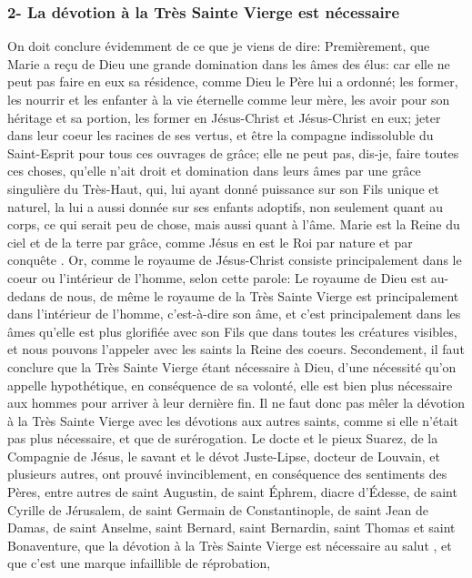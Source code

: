 \subsubsection{2- La dévotion à la Très Sainte Vierge est nécessaire}
 On doit conclure évidemment de ce que je viens de dire:
Premièrement, que Marie a reçu de Dieu une grande domination dans les âmes des élus: car elle ne peut pas faire
en eux sa résidence, comme Dieu le Père lui a ordonné; les former, les nourrir et les enfanter à la vie éternelle
comme leur mère, les avoir pour son héritage et sa portion, les former en Jésus-Christ et Jésus-Christ en eux; jeter
dans leur coeur les racines de ses vertus, et être la compagne indissoluble du Saint-Esprit pour tous ces ouvrages
de grâce; elle ne peut pas, dis-je, faire toutes ces choses, qu'elle n'ait droit et domination dans leurs âmes par une
grâce singulière du Très-Haut, qui, lui ayant donné puissance sur son Fils unique et naturel, la lui a aussi donnée
sur ses enfants adoptifs, non seulement quant au corps, ce qui serait peu de chose, mais aussi quant à l'âme.
 Marie est la Reine du ciel et de la terre par grâce, comme Jésus en est le Roi par nature et par conquête . Or,
comme le royaume de Jésus-Christ consiste principalement dans le coeur ou l'intérieur de l'homme, selon cette
parole: Le royaume de Dieu est au-dedans de nous, de même le royaume de la Très Sainte Vierge est
principalement dans l'intérieur de l'homme, c'est-à-dire son âme, et c'est principalement dans les âmes qu'elle est
plus glorifiée avec son Fils que dans toutes les créatures visibles, et nous pouvons l'appeler avec les saints la
Reine des coeurs.
 Secondement, il faut conclure que la Très Sainte Vierge étant nécessaire à Dieu, d'une nécessité qu'on
appelle hypothétique, en conséquence de sa volonté, elle est bien plus nécessaire aux hommes pour arriver à leur
dernière fin. Il ne faut donc pas mêler la dévotion à la Très Sainte Vierge avec les dévotions aux autres saints,
comme si elle n'était pas plus nécessaire, et que de surérogation.
 Le docte et le pieux Suarez, de la Compagnie de Jésus, le savant et le dévot Juste-Lipse, docteur de Louvain,
et plusieurs autres, ont prouvé invinciblement, en conséquence des sentiments des Pères, entre autres de saint
Augustin, de saint Éphrem, diacre d'Édesse, de saint Cyrille de Jérusalem, de saint Germain de Constantinople,
de saint Jean de Damas, de saint Anselme, saint Bernard, saint Bernardin, saint Thomas et saint Bonaventure,
que la dévotion à la Très Sainte Vierge est nécessaire au salut , et que c'est une marque infaillible de réprobation,
